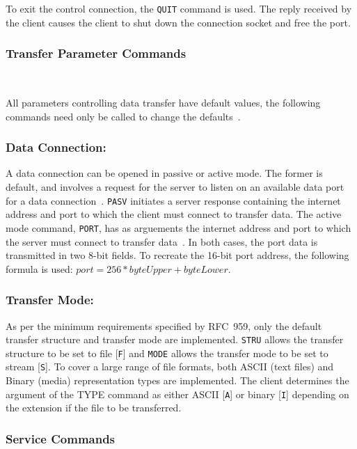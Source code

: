\documentclass[10pt,twocolumn]{witseiepaper}
\begin{document}
To exit the control connection, the \texttt{QUIT} command is used. The reply received by the client causes the client to shut down the connection socket and free the port. 

\vspace*{-2mm}
\subsubsection{Transfer Parameter Commands} $   $

All parameters controlling data transfer have default values, the following commands need only be called to change the defaults~\cite{rfc959}. 

\vspace*{-2mm}
\subsubsection*{Data Connection:} A data connection can be opened in passive or active mode. The former is default, and involves a request for the server to listen on an available data port for a data connection~\cite{rfc959}. \texttt{PASV} initiates a server response containing the internet address and port to which the client must connect to transfer data. The active mode command, \texttt{PORT}, has as arguements the internet address and port to which the server must connect to transfer data~\cite{rfc959}. In both cases, the port data is transmitted in two 8-bit fields. To recreate the 16-bit port address, the following formula is used: $port = 256*byteUpper + byteLower$.

\vspace*{-2mm}
\subsubsection*{Transfer Mode:} 
As per the minimum requirements specified by RFC~959, only the default transfer structure and transfer mode are implemented. \texttt{STRU} allows the transfer structure to be set to file [\texttt{F}] and \texttt{MODE} allows the transfer mode to be set to stream [\texttt{S}]. To cover a large range of file formats, both ASCII (text files) and Binary (media) representation types are implemented. The client determines the argument of the TYPE command as either ASCII [\texttt{A}] or binary [\texttt{I}] depending on the extension if the file to be transferred.

\vspace*{-2mm}
\subsubsection{Service Commands} $    $
\end{document}

